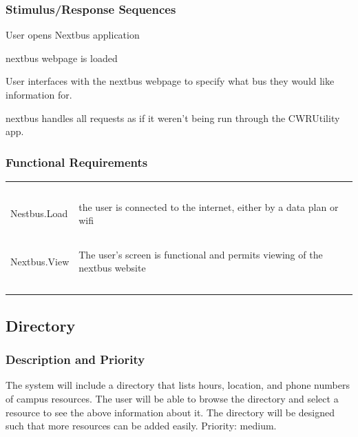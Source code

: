 \documentclass[pdftex,12pt,letter]{article}
\begin{document}
\subsubsection{Stimulus/Response Sequences}
\begin{description}\itemsep1pt
\item[Stimulus:] User opens Nextbus application\\
\item[Response:] nextbus webpage is loaded\\
\item[Stimulus:] User interfaces with the nextbus webpage to specify what bus they would like information for.\\
\item[Response:] nextbus handles all requests as if it weren't being run through the CWRUtility app.\\
\end{description}
\subsubsection{Functional Requirements}
\begin{table}[!h]
\begin{tabularx}{\textwidth }[t]{|l Y|}
\hline
~&~\\
Nestbus.Load &  the user is connected to the internet, either by a data plan or wifi\\ 
~&~\\
Nextbus.View & The user's screen is functional and permits viewing of the nextbus website \\
~&~\\
\hline
\end{tabularx}
\end{table}


\subsection{Directory}
\subsubsection{Description and Priority}
The system will include a directory that lists hours, location, and phone numbers of campus resources. The user will be able to browse the directory and select a resource to see the above information about it. The directory will be designed such that more resources can be added easily. Priority: medium.
\end{document}
